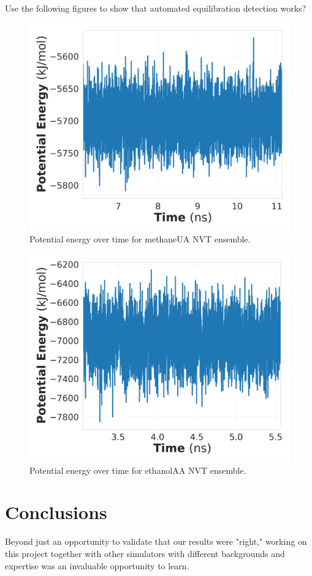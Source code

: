 Use the following figures to show that automated equilibration detection works?
\begin{figure}[h!]
    \centering
    \includegraphics[width=0.8\linewidth,keepaspectratio]{figures/rep_study/methane_pe.png}
    \caption{Potential energy over time for methaneUA NVT ensemble.}\label{fig:methane_pe_evolution}
\end{figure}

\begin{figure}[h!]
    \centering
    \includegraphics[width=0.8\linewidth,keepaspectratio]{figures/rep_study/ethanol_pe.png}
    \caption{Potential energy over time for ethanolAA NVT ensemble.}\label{fig:ethanol_pe_evolution}
\end{figure}

\section{Conclusions}

Beyond just an opportunity to validate that our results were "right," working on this project together with other simulators with different backgrounds and expertise was an invaluable opportunity to learn.
